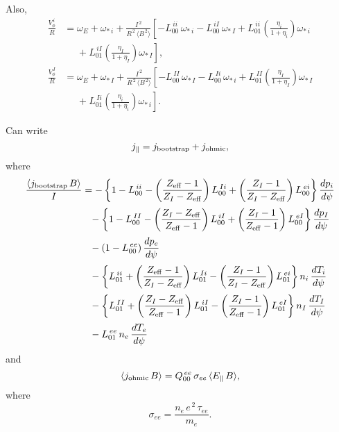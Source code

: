 \documentclass[12pt]{article}
\begin{document}
Also,
\begin{align}
\frac{V_\phi^{\,i}}{R}&=\omega_E +\omega_{\ast\,i} +\frac{I^{\,2}}{R^{\,2}\,\langle B^{\,2}\rangle}\left[-L^{\,ii}_{00}\,\omega_{\ast\,i}-
L^{\,iI}_{00}\,\omega_{\ast\,I}+L^{\,ii}_{01}\left(\frac{\eta_i}{1+\eta_i}\right)\omega_{\ast\,i}\right.\nonumber\\[0.5ex]\phantom{=}
&\left.\phantom{=}+L^{\,iI}_{01}\left(\frac{\eta_I}{1+\eta_I}\right)\omega_{\ast\,I}\right],\\[0.5ex]
\frac{V_\phi^{\,I}}{R}&= \omega_E +\omega_{\ast\,I}+\frac{I^{\,2}}{R^{\,2}\,\langle B^{\,2}\rangle}\left[-L^{\,II}_{00}\,\omega_{\ast\,I}-
L^{\,Ii}_{00}\,\omega_{\ast\,i}+L^{\,II}_{01}\left(\frac{\eta_I}{1+\eta_I}\right)\omega_{\ast\,I}\right.\nonumber\\[0.5ex]\phantom{=}
&\left.\phantom{=}+L^{\,Ii}_{01}\left(\frac{\eta_i}{1+\eta_i}\right)\omega_{\ast\,i}\right].
\end{align}


Can write
\begin{equation}
j_\parallel = j_{\rm bootstrap} + j_{\rm ohmic},
\end{equation}
where
\begin{align}
\frac{\langle j_{\rm bootstrap}\,B\rangle}{I}&= -\left\{1-L^{\,ii}_{00} - \left(\frac{Z_{\rm eff}-1}{Z_I-Z_{\rm eff}}\right)L^{\,Ii}_{00}
+ \left(\frac{Z_I-1}{Z_I-Z_{\rm eff}}\right)L^{\,ei}_{00}\right\}\frac{dp_i}{d\psi}\nonumber\\[0.5ex]
&\phantom{=}
- \left\{1-L^{\,II}_{00} - \left(\frac{Z_I-Z_{\rm eff}}{Z_{\rm eff}-1}\right)L^{\,iI}_{00}
+ \left(\frac{Z_I-1}{Z_{\rm eff}-1}\right)L^{\,eI}_{00}\right\}\frac{dp_I}{d\psi}
\nonumber\\[0.5ex]
&\phantom{=}-(1-L^{\,ee}_{00})\,\frac{dp_e}{d\psi}\nonumber\\[0.5ex]
&\phantom{=}- \left\{L^{\,ii}_{01} + \left(\frac{Z_{\rm eff}-1}{Z_I-Z_{\rm eff}}\right)L^{\,Ii}_{01}
- \left(\frac{Z_I-1}{Z_I-Z_{\rm eff}}\right)L^{\,ei}_{01}\right\}n_i\,\frac{dT_i}{d\psi}\nonumber\\[0.5ex]
&\phantom{=}
- \left\{L^{\,II}_{01} + \left(\frac{Z_I-Z_{\rm eff}}{Z_{\rm eff}-1}\right)L^{\,iI}_{01}
- \left(\frac{Z_I-1}{Z_{\rm eff}-1}\right)L^{\,eI}_{01}\right\}n_I\,\frac{dT_I}{d\psi}
\nonumber\\[0.5ex]
&\phantom{=}-L^{\,ee}_{01}\,n_e\,\frac{dT_e}{d\psi}
\end{align}
and
\begin{equation}
\langle j_{\rm ohmic}\,B\rangle = Q^{\,ee}_{00}\,\sigma_{ee}\,\langle E_\parallel\,B\rangle,
\end{equation}
where 
\begin{equation}
\sigma_{ee} = \frac{n_e\,e^{\,2}\,\tau_{ee}}{m_e}.
\end{equation}
\end{document}
